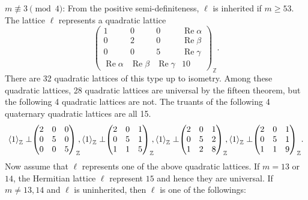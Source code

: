 \documentclass[a4paper,10pt,reqno]{amsart}
\begin{document}
{} $m {\not\equiv} 3 \pmod 4$:  From the positive semi-definiteness, $\ell$ is inherited
if $m \geq 53$. The lattice $\ell$ represents a quadratic lattice
\[
    \begin{pmatrix}
        1 & 0 & 0 & {\operatorname{Re}}{\alpha} \\
        0 & 2 & 0 & {\operatorname{Re}}{\beta} \\
        0 & 0 & 5 & {\operatorname{Re}}{\gamma} \\
        {\operatorname{Re}}{\alpha} & {\operatorname{Re}}{\beta} & {\operatorname{Re}}{\gamma} & 10
    \end{pmatrix}_{\mathbb{Z}}.
\]
There are 32 quadratic lattices of this type up to isometry. Among these quadratic lattices, 28
quadratic lattices are universal by the fifteen theorem, but the following 4 quadratic lattices are
not. The truants of the following 4 quaternary quadratic lattices are all 15.
\[
{\langle {1} \rangle}_{\mathbb{Z}} \perp \negthickspace{\begin{pmatrix}
  {2} & {0} & {0} \\
  {0} & {5} & {0} \\
  {0} & {0} & {5}
\end{pmatrix}}_{\mathbb{Z}}\negthickspace, {\langle {1} \rangle}_{\mathbb{Z}} \perp \negthickspace{\begin{pmatrix}
  {2} & {0} & {1} \\
  {0} & {5} & {1} \\
  {1} & {1} & {5}
\end{pmatrix}}_{\mathbb{Z}}\negthickspace, {\langle {1} \rangle}_{\mathbb{Z}} \perp \negthickspace{\begin{pmatrix}
  {2} & {0} & {1} \\
  {0} & {5} & {2} \\
  {1} & {2} & {8}
\end{pmatrix}}_{\mathbb{Z}}\negthickspace, {\langle {1} \rangle}_{\mathbb{Z}} \perp
\negthickspace{\begin{pmatrix}
  {2} & {0} & {1} \\
  {0} & {5} & {1} \\
  {1} & {1} & {9}
\end{pmatrix}}_{\mathbb{Z}}.
\]
Now assume that $\ell$ represents one of the above quadratic lattices. If $m=13$ or $14$, the
Hermitian lattice $\ell$ represent $15$ and hence they are universal. If $m \ne 13, 14$ and $\ell$
is uninherited, then $\ell$ is one of the followings:
\end{document}
